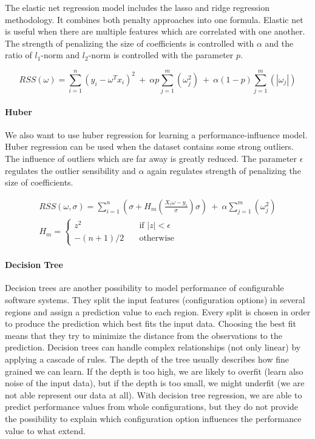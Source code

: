 The elastic net regression model includes the lasso and ridge regression methodology. It combines both penalty approaches into one formula. Elastic net is useful when there are multiple features which are correlated with one another. The strength of penalizing the size of coefficients is controlled with $\alpha$ and the ratio of $l_1$-norm and $l_2$-norm is controlled with the parameter $p$.

\begin{equation}
    \label{def:RSS:ElNet}
    RSS(\omega)=\sum_{i=1}^n(y_i-\omega^T x_i)^2\ +\ \alpha p\sum_{j=1}^m(\omega_j^2)\ +\ \alpha(1-p)\sum_{j=1}^m(|\omega_j|)
\end{equation}


\paragraph{Huber}

We also want to use huber regression for learning a performance-influence model. Huber regression can be used when the dataset contains some strong outliers. The influence of outliers which are far away is greatly reduced. The parameter $\epsilon$ regulates the outlier sensibility and $\alpha$ again regulates strength of penalizing the size of coefficients. 

\begin{equation}
    \label{def:RSS:Huber}
    \begin{aligned}
    RSS(\omega,\sigma)=\sum_{i=1}^n(\sigma+H_m(\frac{X_i\omega-y_i}{\sigma})\sigma)\ +\ \alpha\sum_{j=1}^m(\omega_j^2)
    \\
    H_m=\begin{cases}
            z^2       & \quad \text{if } |z| < \epsilon\\
            -(n+1)/2  & \quad \text{otherwise}
        \end{cases}
    \end{aligned}
\end{equation}


\paragraph{Decision Tree}

Decision trees are another possibility to model performance of configurable software systems. They split the input features (configuration options) in several regions and assign a prediction value to each region. Every split is chosen in order to produce the prediction which best fits the input data. Choosing the best fit means that they try to minimize the distance from the observations to the prediction. Decision trees can handle complex relationships (not only linear) by applying a cascade of rules. The depth of the tree usually describes how fine grained we can learn. If the depth is too high, we are likely to overfit (learn also noise of the input data), but if the depth is too small, we might underfit (we are not able represent our data at all). With decision tree regression, we are able to predict performance values from whole configurations, but they do not provide the possibility to explain which configuration option influences the performance value to what extend.


